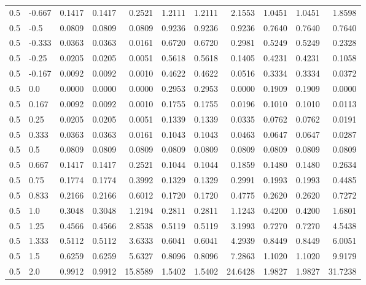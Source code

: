 \begin{table}[h!]
\begin{tabular}{ll rrr rrr rrr}
   0.5 & -0.667 & 0.1417 & 0.1417 & 0.2521   & 1.2111 & 1.2111 & 2.1553    & 1.0451 & 1.0451 & 1.8598 \\
   0.5 & -0.5   & 0.0809 & 0.0809 & 0.0809   & 0.9236 & 0.9236 & 0.9236    & 0.7640 & 0.7640 & 0.7640 \\
   0.5 & -0.333 & 0.0363 & 0.0363 & 0.0161   & 0.6720 & 0.6720 & 0.2981    & 0.5249 & 0.5249 & 0.2328 \\
   0.5 & -0.25  & 0.0205 & 0.0205 & 0.0051   & 0.5618 & 0.5618 & 0.1405    & 0.4231 & 0.4231 & 0.1058 \\
   0.5 & -0.167 & 0.0092 & 0.0092 & 0.0010   & 0.4622 & 0.4622 & 0.0516    & 0.3334 & 0.3334 & 0.0372 \\
   0.5 & 0.0    & 0.0000 & 0.0000 & 0.0000   & 0.2953 & 0.2953 & 0.0000    & 0.1909 & 0.1909 & 0.0000 \\
   0.5 & 0.167  & 0.0092 & 0.0092 & 0.0010   & 0.1755 & 0.1755 & 0.0196    & 0.1010 & 0.1010 & 0.0113 \\
   0.5 & 0.25   & 0.0205 & 0.0205 & 0.0051   & 0.1339 & 0.1339 & 0.0335    & 0.0762 & 0.0762 & 0.0191 \\
   0.5 & 0.333  & 0.0363 & 0.0363 & 0.0161   & 0.1043 & 0.1043 & 0.0463    & 0.0647 & 0.0647 & 0.0287 \\
   0.5 & 0.5    & 0.0809 & 0.0809 & 0.0809   & 0.0809 & 0.0809 & 0.0809    & 0.0809 & 0.0809 & 0.0809 \\
   0.5 & 0.667  & 0.1417 & 0.1417 & 0.2521   & 0.1044 & 0.1044 & 0.1859    & 0.1480 & 0.1480 & 0.2634 \\
   0.5 & 0.75   & 0.1774 & 0.1774 & 0.3992   & 0.1329 & 0.1329 & 0.2991    & 0.1993 & 0.1993 & 0.4485 \\
   0.5 & 0.833  & 0.2166 & 0.2166 & 0.6012   & 0.1720 & 0.1720 & 0.4775    & 0.2620 & 0.2620 & 0.7272 \\
   0.5 & 1.0    & 0.3048 & 0.3048 & 1.2194   & 0.2811 & 0.2811 & 1.1243    & 0.4200 & 0.4200 & 1.6801 \\
   0.5 & 1.25   & 0.4566 & 0.4566 & 2.8538   & 0.5119 & 0.5119 & 3.1993    & 0.7270 & 0.7270 & 4.5438 \\
   0.5 & 1.333  & 0.5112 & 0.5112 & 3.6333   & 0.6041 & 0.6041 & 4.2939    & 0.8449 & 0.8449 & 6.0051 \\
   0.5 & 1.5    & 0.6259 & 0.6259 & 5.6327   & 0.8096 & 0.8096 & 7.2863    & 1.1020 & 1.1020 & 9.9179 \\
   0.5 & 2.0    & 0.9912 & 0.9912 & 15.8589  & 1.5402 & 1.5402 & 24.6428   & 1.9827 & 1.9827 & 31.7238 \\

\end{tabular}
\end{table}
